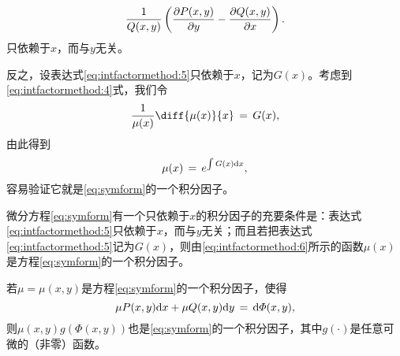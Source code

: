 \begin{equation}\label{eq:intfactormethod:5}
\frac{1}{Q(x,y)}\left(\frac{\partial{}P(x,y)}{\partial{}y}-\frac{\partial{}Q(x,y)}{\partial{}x}\right).
\end{equation}
只依赖于$x$，而与$y$无关。\par
反之，设表达式\eqref{eq:intfactormethod:5}只依赖于$x$，记为$G(x)$。考虑到\eqref{eq:intfactormethod:4}式，我们令
$$\frac{1}{\mu(x)}\diff{\mu(x)}{x}\,=\,G(x),$$
由此得到
\begin{equation}\label{eq:intfactormethod:6}
\mu(x)\,=\,e^{\int G(x)\mathrm{d} x},
\end{equation}
容易验证它就是\eqref{eq:symform}的一个积分因子。
\begin{theo}\label{theo:intfactormethod:1}
微分方程\eqref{eq:symform}有一个只依赖于$x$的积分因子的充要条件是：表达式\eqref{eq:intfactormethod:5}只依赖于$x$，而与$y$无关；而且若把表达式\eqref{eq:intfactormethod:5}记为$G(x)$，则由\eqref{eq:intfactormethod:6}所示的函数$\mu(x)$是方程\eqref{eq:symform}的一个积分因子。
\end{theo}
\begin{theo}\label{theo:intfactormethod:2}
若$\mu=\mu(x,y)$是方程\eqref{eq:symform}的一个积分因子，使得
$$\mu P(x,y)\mathrm{d} x+\mu Q(x,y)\mathrm{d} y\,=\,\mathrm{d}\varPhi(x,y),$$
则$\mu(x,y)g(\varPhi(x,y))$也是\eqref{eq:symform}的一个积分因子，其中$g(\cdot)$是任意可微的（非零）函数。
\end{theo}

